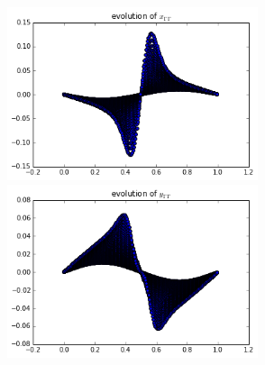 \documentclass[12pt,twoside]{article}
\begin{document}
\begin{figure}[ht]
\centering
\begin{minipage}[b]{0.45\linewidth}
\includegraphics[width=3in,height=2in]{xppT054.png}

\includegraphics[width=3in,height=2in]{yppT054.png}


\end{minipage}
\end{figure}
\end{document}
